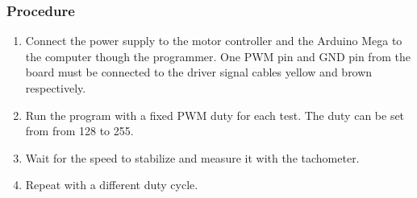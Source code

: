 \subsubsection{Procedure}
\begin{enumerate}
	\item Connect the power supply to the motor controller and the Arduino Mega to the computer though the programmer. One PWM pin and GND pin from the board must be connected to the driver signal cables yellow and brown respectively. 
	\item Run the program with a fixed PWM duty for each test. The duty can be set from from 128 to 255.
	\item Wait for the speed to stabilize and measure it with the tachometer. 
	\item Repeat with a different duty cycle.
\end{enumerate}

